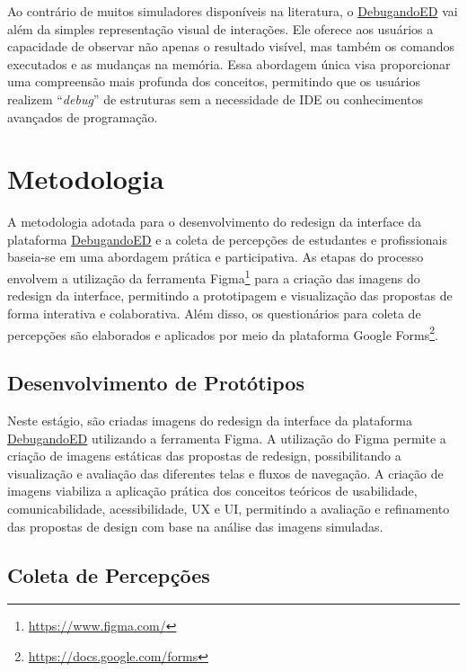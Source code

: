 Ao contrário de muitos simuladores disponíveis na literatura, o \href{https://debugandoed.facom.ufu.br/}{DebugandoED} vai além da simples representação visual de interações. Ele oferece aos usuários a capacidade de observar não apenas o resultado visível, mas também os comandos executados e as mudanças na memória. Essa abordagem única visa proporcionar uma compreensão mais profunda dos conceitos, permitindo que os usuários realizem “\textit{debug}” de estruturas sem a necessidade de \ac{IDE} ou conhecimentos avançados de programação.

\section{Metodologia}
\label{secMetodologia}

A metodologia adotada para o desenvolvimento do redesign da interface da plataforma \href{https://debugandoed.facom.ufu.br/}{DebugandoED} e a coleta de percepções de estudantes e profissionais baseia-se em uma abordagem prática e participativa. As etapas do processo envolvem a utilização da ferramenta Figma\footnote{\url{https://www.figma.com/}} para a criação das imagens do redesign da interface, permitindo a prototipagem e visualização das propostas de forma interativa e colaborativa. Além disso, os questionários para coleta de percepções são elaborados e aplicados por meio da plataforma Google Forms\footnote{\url{https://docs.google.com/forms}}.


\subsection{Desenvolvimento de Protótipos}

Neste estágio, são criadas imagens do redesign da interface da plataforma \href{https://debugandoed.facom.ufu.br/}{DebugandoED} utilizando a ferramenta Figma. A utilização do Figma permite a criação de imagens estáticas das propostas de redesign, possibilitando a visualização e avaliação das diferentes telas e fluxos de navegação. A criação de imagens viabiliza a aplicação prática dos conceitos teóricos de usabilidade, comunicabilidade, acessibilidade, \ac{UX} e \ac{UI}, permitindo a avaliação e refinamento das propostas de design com base na análise das imagens simuladas.

\subsection{Coleta de Percepções}

